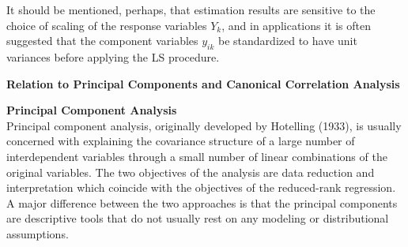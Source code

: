 It should be mentioned, perhaps, that estimation results are sensitive to the choice of scaling of the response variables $Y_k$, and in applications it is often suggested that the component variables $y_{ik}$ be standardized to have unit variances before applying the LS procedure. \\

\begin{center} \textbf{Relation to Principal Components and Canonical Correlation Analysis} \newline \\\end{center}


\noindent \textbf{Principal Component Analysis} \\


\noindent Principal component analysis, originally developed by Hotelling (1933), is usually concerned with explaining the covariance structure of a large number of interdependent variables through a small number of linear combinations of the original variables. The two objectives of the analysis are data reduction and interpretation which coincide with the objectives of the reduced-rank regression. A major difference between the two approaches is that the principal components are descriptive tools that do not usually rest on any modeling or distributional assumptions. 


